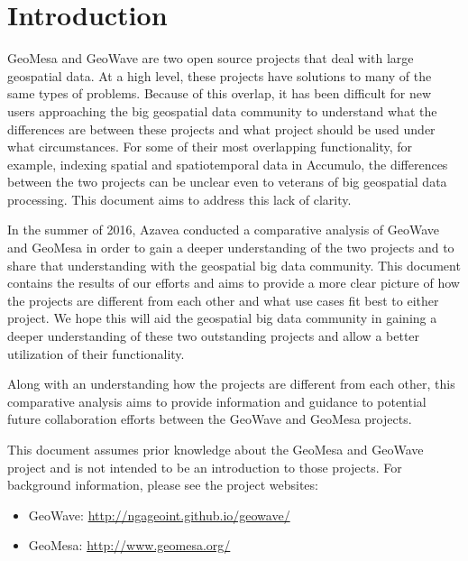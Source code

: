 \section{Introduction}
\label{sec:introduction}

GeoMesa and GeoWave are two open source projects that deal with large geospatial data.
At a high level, these projects have solutions to many of the same types of problems.
Because of this overlap, it has been difficult for new users approaching the big geospatial data community to understand what the differences are between these projects and what project should be used under what circumstances.
For some of their most overlapping functionality, for example, indexing spatial and spatiotemporal data in Accumulo, the differences between the two projects can be unclear even to veterans of big geospatial data processing.
This document aims to address this lack of clarity.

In the summer of 2016, Azavea conducted a comparative analysis of GeoWave and GeoMesa in order to gain a deeper understanding of the two projects and to share that understanding with the geospatial big data community.
This document contains the results of our efforts and aims to provide a more clear picture of how the projects are different from each other and what use cases fit best to either project.
We hope this will aid the geospatial big data community in gaining a deeper understanding of these two outstanding projects and allow a better utilization of their functionality.

Along with an understanding how the projects are different from each other, this comparative analysis aims to provide information and guidance to potential future collaboration efforts between the GeoWave and GeoMesa projects.

This document assumes prior knowledge about the GeoMesa and GeoWave project and is not intended to be an introduction to those projects.
For background information, please see the project websites:


\begin{itemize}
\item  GeoWave: \url{http://ngageoint.github.io/geowave/}
\item  GeoMesa: \url{http://www.geomesa.org/}
\end{itemize}
